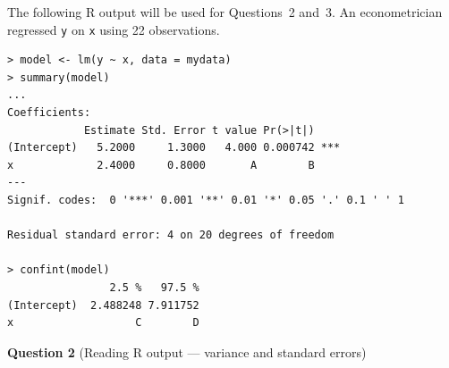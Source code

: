 \documentclass[11pt,a4paper]{article}
\begin{document}
The following R output will be used for Questions~2 and~3. An econometrician regressed \verb!y! on \verb!x! using 22 observations.
\small
\begin{verbatim}
> model <- lm(y ~ x, data = mydata)
> summary(model)
...
Coefficients:
            Estimate Std. Error t value Pr(>|t|)
(Intercept)   5.2000     1.3000   4.000 0.000742 ***
x             2.4000     0.8000       A        B
---
Signif. codes:  0 '***' 0.001 '**' 0.01 '*' 0.05 '.' 0.1 ' ' 1

Residual standard error: 4 on 20 degrees of freedom

> confint(model)
                2.5 %   97.5 %
(Intercept)  2.488248 7.911752
x                   C        D
\end{verbatim}
\normalsize

\bigskip
\textbf{Question 2} (Reading R output --- variance and standard errors)
\end{document}
